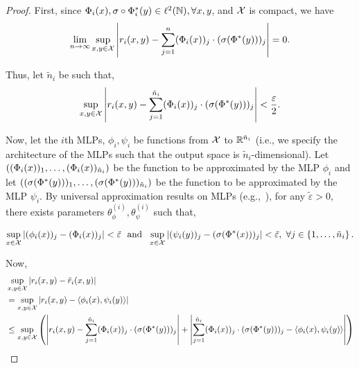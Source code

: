 \begin{proof}
    First, since $\Phi_i(x), \sigma \circ \Phi^*_i(y) \in \ell^2({\mathbb{N}}), \forall x, y$, and ${\mathcal{X}}$ is compact, we have
    \begin{equation*}
        \lim_{n \to \infty} \sup_{x,y \in {\mathcal{X}}} \left\lvert r_i(x, y) - \sum_{j=1}^{n} (\Phi_i(x))_j \cdot (\sigma(\Phi^*(y)))_j\right\rvert = 0.
    \end{equation*}

    Thus, let $\tilde{n}_i$ be such that,
    \begin{equation}\label{eq:thm1_proof_eq1}
        \sup_{x,y \in {\mathcal{X}}} \left\lvert r_i(x, y) - \sum_{j=1}^{\tilde{n}_i} (\Phi_i(x))_j \cdot (\sigma(\Phi^*(y)))_j\right\rvert < \frac{\varepsilon}{2}.
    \end{equation}

    Now, let the $i$th MLPs, $\phi_i, \psi_i$ be functions from ${\mathcal{X}}$ to $\mathbb{R}^{\tilde{n}_i}$ (i.e., we specify the architecture of the MLPs such that the output space is $\tilde{n}_i$-dimensional). Let $\left((\Phi_i(x))_1, \ldots, (\Phi_i(x))_{\tilde{n}_i}\right)$ be the function to be approximated by the MLP $\phi_i$ and let $\left((\sigma(\Phi^*(y)))_1, \ldots, (\sigma(\Phi^*(y)))_{\tilde{n}_i}\right)$ be the function to be approximated by the MLP $\psi_i$. By universal approximation results on MLPs (e.g.,~\citep{barronUniversalApproximation1993, cybenkoApproximationSuperpositions1989, hornikMultilayerFeedforward1989}), for any $\tilde{\varepsilon} > 0$, there exists parameters $\theta_{\phi}^{(i)}, \theta_{\psi}^{(i)}$ such that,

    \begin{equation}\label{eq:thm1_proof_eq2}
        \sup_{x \in {\mathcal{X}}} \left\lvert(\phi_i(x))_j - (\Phi_i(x))_{j}\right\rvert < \tilde{\varepsilon} \ \text{ and } \ \sup_{x \in {\mathcal{X}}} \left\lvert(\psi_i(y))_j - (\sigma(\Phi^*(x)))_{j}\right\rvert < \tilde{\varepsilon}, \ \forall j \in \left\{1, \ldots, \tilde{n}_i\right\}.
    \end{equation}

    Now, 
    \begin{align*}
        &\sup_{x,y \in {\mathcal{X}}} \left\lvert r_i(x,y) - \tilde{r}_i(x,y)\right\rvert \\
        &= \sup_{x,y \in {\mathcal{X}}} \left\lvert r_i(x,y) - \left \langle \phi_i(x), \psi_i(y) \right\rangle\right\rvert \\
        &\leq \sup_{x,y\in {\mathcal{X}}} \left(\left\lvert r_i(x,y) - \sum_{j=1}^{\tilde{n}_i} (\Phi_i(x))_j \cdot (\sigma(\Phi^*(y)))_j\right\rvert + \left\lvert\sum_{j=1}^{\tilde{n}_i} (\Phi_i(x))_j \cdot (\sigma(\Phi^*(y)))_j - \left \langle \phi_i(x), \psi_i(y) \right\rangle\right\rvert\right) \\
    \end{align*}


\end{proof}
